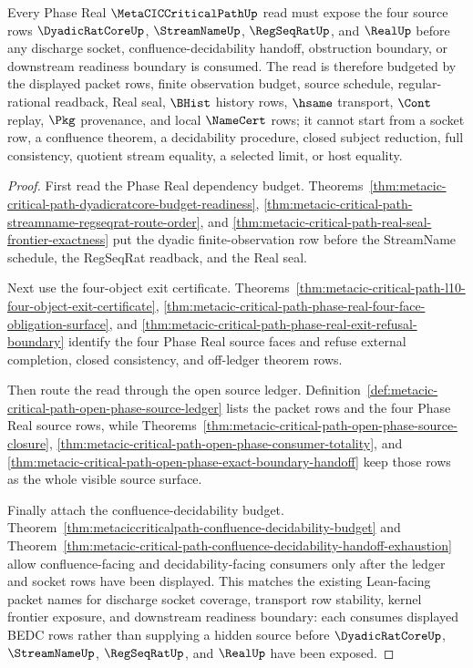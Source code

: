 \begin{theorem}
\label{thm:metacic-critical-path-phase-real-source-obligations}
Every Phase Real $\MetaCICCriticalPathUp$ read must expose the four source
rows $\DyadicRatCoreUp$, $\StreamNameUp$, $\RegSeqRatUp$, and $\RealUp$
before any discharge socket, confluence-decidability handoff, obstruction
boundary, or downstream readiness boundary is consumed. The read is therefore
budgeted by the displayed packet rows, finite observation budget, source
schedule, regular-rational readback, Real seal, $\BHist$ history rows,
$\hsame$ transport, $\Cont$ replay, $\Pkg$ provenance, and local $\NameCert$
rows; it cannot start from a socket row, a confluence theorem, a decidability
procedure, closed subject reduction, full consistency, quotient stream
equality, a selected limit, or host equality.
\end{theorem}
\begin{proof}
First read the Phase Real dependency budget. Theorems~\ref{thm:metacic-critical-path-dyadicratcore-budget-readiness}, \ref{thm:metacic-critical-path-streamname-regseqrat-route-order}, and \ref{thm:metacic-critical-path-real-seal-frontier-exactness} put the dyadic finite-observation row before the StreamName schedule, the RegSeqRat readback, and the Real seal.

Next use the four-object exit certificate. Theorems~\ref{thm:metacic-critical-path-l10-four-object-exit-certificate}, \ref{thm:metacic-critical-path-phase-real-four-face-obligation-surface}, and \ref{thm:metacic-critical-path-phase-real-exit-refusal-boundary} identify the four Phase Real source faces and refuse external completion, closed consistency, and off-ledger theorem rows.

Then route the read through the open source ledger. Definition~\ref{def:metacic-critical-path-open-phase-source-ledger} lists the packet rows and the four Phase Real source rows, while Theorems~\ref{thm:metacic-critical-path-open-phase-source-closure}, \ref{thm:metacic-critical-path-open-phase-consumer-totality}, and \ref{thm:metacic-critical-path-open-phase-exact-boundary-handoff} keep those rows as the whole visible source surface.

Finally attach the confluence-decidability budget. Theorem~\ref{thm:metaciccriticalpath-confluence-decidability-budget} and Theorem~\ref{thm:metacic-critical-path-confluence-decidability-handoff-exhaustion} allow confluence-facing and decidability-facing consumers only after the ledger and socket rows have been displayed. This matches the existing Lean-facing packet names for discharge socket coverage, transport row stability, kernel frontier exposure, and downstream readiness boundary: each consumes displayed BEDC rows rather than supplying a hidden source before $\DyadicRatCoreUp$, $\StreamNameUp$, $\RegSeqRatUp$, and $\RealUp$ have been exposed.
\end{proof}

